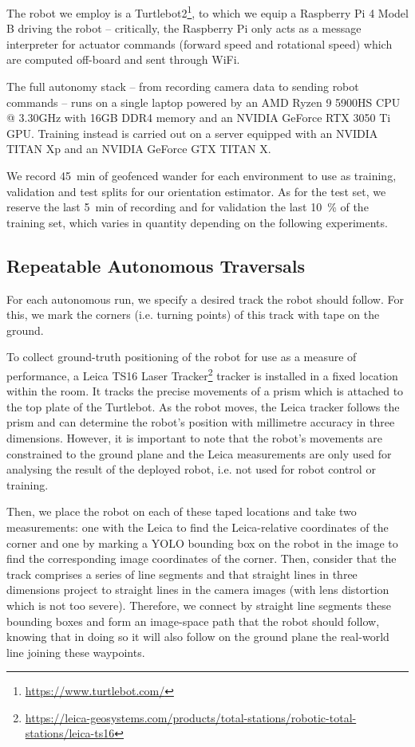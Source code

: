 \documentclass[conference]{ieeeconf}
\begin{document}
The robot we employ is a Turtlebot2\footnote{\url{https://www.turtlebot.com/}}, to which we equip a Raspberry Pi 4 Model B driving the robot -- critically, the Raspberry Pi only acts as a message interpreter for actuator commands (forward speed and rotational speed) which are computed off-board and sent through WiFi.

The full autonomy stack -- from recording camera data to sending robot commands -- runs on a single laptop powered by an AMD Ryzen 9 5900HS CPU @ 3.30GHz with 16GB DDR4 memory and an NVIDIA GeForce RTX 3050 Ti GPU.
Training instead is carried out on a server equipped with an NVIDIA TITAN Xp and an NVIDIA GeForce GTX TITAN X.

We record \SI{45}{\minute} of geofenced wander for each environment to use as training, validation and test splits for our orientation estimator.
As for the test set, we reserve the last \SI{5}{\minute} of recording and for validation the last \SI{10}{\percent} of the training set, which varies in quantity depending on the following experiments.


\subsection{Repeatable Autonomous Traversals}%
\label{sec:noteachRepeat}
For each autonomous run, we specify a desired track the robot should follow.
For this, we mark the corners (i.e. turning points) of this track with tape on the ground.

To collect ground-truth positioning of the robot for use as a measure of performance, a Leica TS16 Laser Tracker\footnote{\url{https://leica-geosystems.com/products/total-stations/robotic-total-stations/leica-ts16}} tracker is installed in a fixed location within the room.
It tracks the precise movements of a prism which is attached to the top plate of the Turtlebot.
As the robot moves, the Leica tracker follows the prism and can determine the robot's position with millimetre accuracy in three dimensions.
However, it is important to note that the robot's movements are constrained to the ground plane and the Leica measurements are only used for analysing the result of the deployed robot, i.e. not used for robot control or training.

Then, we place the robot on each of these taped locations and take two measurements: one with the Leica to find the Leica-relative coordinates of the corner and one by marking a YOLO bounding box on the robot in the image to find the corresponding image coordinates of the corner.
Then, consider that the track comprises a series of line segments and that straight lines in three dimensions project to straight lines in the camera images (with lens distortion which is not too severe).
Therefore, we connect by straight line segments these bounding boxes and form an image-space path that the robot should follow, knowing that in doing so it will also follow on the ground plane the real-world line joining these waypoints.
\end{document}
